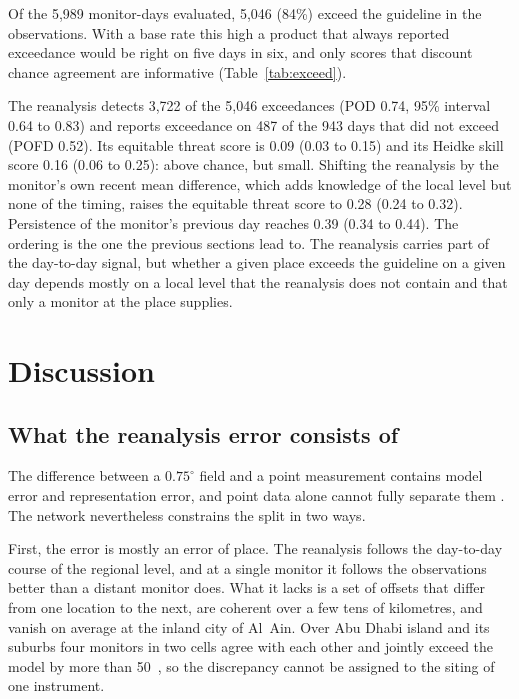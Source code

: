 Of the 5,989 monitor-days evaluated, 5,046 (84\%) exceed the guideline in the observations. With
a base rate this high a product that always reported exceedance would be right on five days in
six, and only scores that discount chance agreement are informative (Table~\ref{tab:exceed}).

The reanalysis detects 3,722 of the 5,046 exceedances (POD 0.74, 95\% interval 0.64 to 0.83) and
reports exceedance on 487 of the 943 days that did not exceed (POFD 0.52). Its equitable threat
score is 0.09 (0.03 to 0.15) and its Heidke skill score 0.16 (0.06 to 0.25): above chance, but
small. Shifting the reanalysis by the monitor's own recent mean difference, which adds knowledge
of the local level but none of the timing, raises the equitable threat score to 0.28 (0.24 to
0.32). Persistence of the monitor's previous day reaches 0.39 (0.34 to 0.44). The ordering is the
one the previous sections lead to. The reanalysis carries part of the day-to-day signal, but
whether a given place exceeds the guideline on a given day depends mostly on a local level that
the reanalysis does not contain and that only a monitor at the place supplies.

\section{Discussion}

\subsection{What the reanalysis error consists of}

The difference between a $0.75^{\circ}$ field and a point measurement contains model error and
representation error, and point data alone cannot fully separate them
\citep{schutgens2016,janjic2018}. The network nevertheless constrains the split in two ways.

First, the error is mostly an error of place. The reanalysis follows the day-to-day course of
the regional level, and at a single monitor it follows the observations better than a distant
monitor does. What it lacks is a set of offsets that differ from one location to the next, are
coherent over a few tens of kilometres, and vanish on average at the inland city of Al~Ain. Over
Abu Dhabi island and its suburbs four monitors in two cells agree with each other and jointly
exceed the model by more than 50~\ugm{}, so the discrepancy cannot be assigned to the siting of
one instrument.

